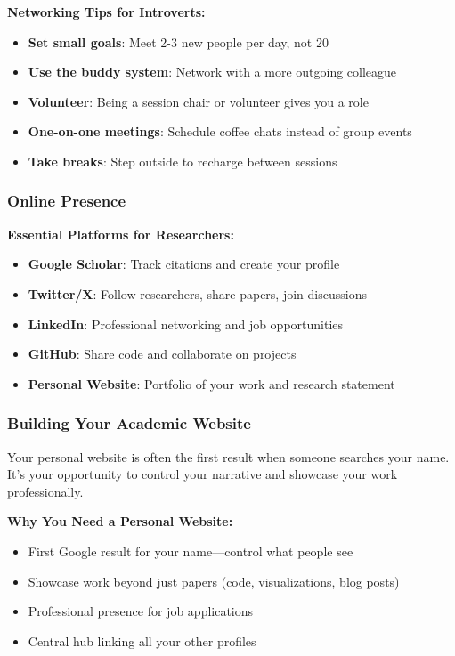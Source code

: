 \documentclass[11pt,a4paper]{article}
\begin{document}
\textbf{Networking Tips for Introverts:}
\begin{itemize}
    \item \textbf{Set small goals}: Meet 2-3 new people per day, not 20
    \item \textbf{Use the buddy system}: Network with a more outgoing colleague
    \item \textbf{Volunteer}: Being a session chair or volunteer gives you a role
    \item \textbf{One-on-one meetings}: Schedule coffee chats instead of group events
    \item \textbf{Take breaks}: Step outside to recharge between sessions
\end{itemize}

\subsubsection{Online Presence}

\textbf{Essential Platforms for Researchers:}
\begin{itemize}
    \item \textbf{Google Scholar}: Track citations and create your profile
    \item \textbf{Twitter/X}: Follow researchers, share papers, join discussions
    \item \textbf{LinkedIn}: Professional networking and job opportunities
    \item \textbf{GitHub}: Share code and collaborate on projects
    \item \textbf{Personal Website}: Portfolio of your work and research statement
\end{itemize}

\subsubsection{Building Your Academic Website}

\begin{tcolorbox}[colback=green!5,colframe=green!50,title=Your Digital Academic Identity]
Your personal website is often the first result when someone searches your name. It's your opportunity to control your narrative and showcase your work professionally.
\end{tcolorbox}

\textbf{Why You Need a Personal Website:}
\begin{itemize}
    \item First Google result for your name—control what people see
    \item Showcase work beyond just papers (code, visualizations, blog posts)
    \item Professional presence for job applications
    \item Central hub linking all your other profiles
\end{itemize}
\end{document}
